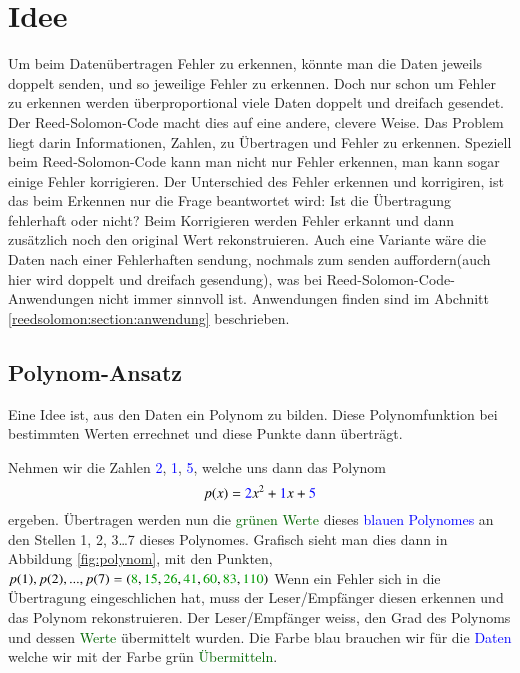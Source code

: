 %
%
\section{Idee
\label{reedsolomon:section:idee}}
Um beim Datenübertragen Fehler zu erkennen, könnte man die Daten jeweils doppelt senden,
und so jeweilige Fehler zu erkennen.
Doch nur schon um Fehler zu erkennen werden überproportional viele Daten doppelt und dreifach gesendet.
Der Reed-Solomon-Code macht dies auf eine andere, clevere Weise.
Das Problem liegt darin Informationen, Zahlen, 
zu Übertragen und Fehler zu erkennen.
Speziell beim Reed-Solomon-Code kann man nicht nur Fehler erkennen, 
man kann sogar einige Fehler korrigieren.
Der Unterschied des Fehler erkennen und korrigiren, ist das beim Erkennen nur die Frage beantwortet wird: Ist die Übertragung fehlerhaft oder nicht?
Beim Korrigieren werden Fehler erkannt und dann zusätzlich noch den original Wert rekonstruieren.
Auch eine Variante wäre die Daten nach einer Fehlerhaften sendung, nochmals zum senden auffordern(auch hier wird doppelt und dreifach gesendung), 
was bei Reed-Solomon-Code-Anwendungen nicht immer sinnvoll ist. 
Anwendungen finden sind im Abchnitt 
\ref{reedsolomon:section:anwendung} beschrieben.

\subsection{Polynom-Ansatz
\label{reedsolomon:section:polynomansatz}}
Eine Idee ist, aus den Daten ein Polynom zu bilden.
Diese Polynomfunktion bei bestimmten Werten errechnet und diese Punkte dann überträgt.
\begin{beispiel} Nehmen wir die Zahlen \textcolor{blue}{2}, \textcolor{blue}{1}, \textcolor{blue}{5},
welche uns dann das Polynom 
\begin{equation}
p(x)
=
\textcolor{blue}{2}x^2 + \textcolor{blue}{1}x + \textcolor{blue}{5}
\label{reedsolomon:equation1}
\end{equation}
ergeben.
Übertragen werden nun die \textcolor{darkgreen}{grünen Werte} 
dieses \textcolor{blue}{blauen Polynomes} an den Stellen 1, 2, 3\dots 7 dieses Polynomes.
Grafisch sieht man dies dann in Abbildung \ref{fig:polynom}, 
mit den Punkten, $p(1),p(2),...,p(7) = (\textcolor{darkgreen}{8}, 
\textcolor{darkgreen}{15}, \textcolor{darkgreen}{26},
\textcolor{darkgreen}{41}, \textcolor{darkgreen}{60}, 
\textcolor{darkgreen}{83}, \textcolor{darkgreen}{110})$
Wenn ein Fehler sich in die Übertragung eingeschlichen hat, muss der Leser/Empfänger diesen erkennen und das Polynom rekonstruieren.
Der Leser/Empfänger weiss, den Grad des Polynoms und dessen \textcolor{darkgreen}{Werte} übermittelt wurden. 
Die Farbe blau brauchen wir für die \textcolor{blue}{Daten} welche wir mit der Farbe grün \textcolor{darkgreen}{Übermitteln}.
\end{beispiel}

